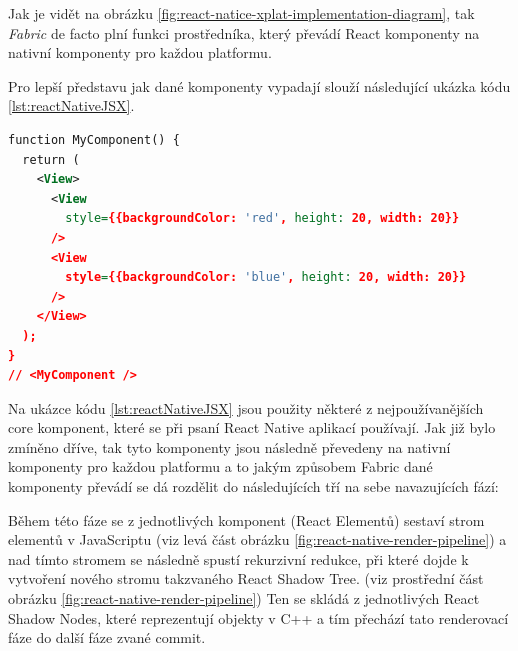 



Jak je vidět na obrázku \ref{fig:react-natice-xplat-implementation-diagram}, tak \textit{Fabric} de facto plní funkci prostředníka, který převádí React 
komponenty na nativní komponenty pro každou platformu. 

Pro lepší představu jak dané komponenty vypadají slouží následující ukázka kódu \ref{lst:reactNativeJSX}.

\begin{lstlisting}[caption={Popis UI komponent pomoci JSX}, label={lst:reactNativeJSX}, language=XML]
function MyComponent() {
  return (
    <View>
      <View
        style={{backgroundColor: 'red', height: 20, width: 20}}
      />
      <View
        style={{backgroundColor: 'blue', height: 20, width: 20}}
      />
    </View>
  );
}
// <MyComponent />
\end{lstlisting}

Na ukázce kódu \ref{lst:reactNativeJSX} jsou použity některé z nejpoužívanějších core komponent, které se při psaní React
Native aplikací používají. \cite{reactNativeComponents} Jak již bylo zmíněno dříve, tak tyto komponenty jsou následně převedeny 
na nativní komponenty pro každou platformu a to jakým způsobem Fabric dané komponenty převádí se dá rozdělit do následujících tří
na sebe navazujících fází: \cite{reactNativeRenderCommitMount}
 

\smallskip

Během této fáze se z jednotlivých komponent (React Elementů) sestaví strom elementů v JavaScriptu (viz levá část obrázku \ref{fig:react-native-render-pipeline}) a nad tímto stromem se 
následně spustí rekurzivní redukce, při které dojde k vytvoření nového stromu takzvaného React Shadow Tree. (viz prostřední část obrázku \ref{fig:react-native-render-pipeline})
\cite{reactNativeRenderCommitMount} Ten se skládá z jednotlivých React Shadow Nodes, které reprezentují objekty v C++ a tím přechází tato renderovací fáze do další fáze zvané commit.\cite{reactNativeRenderCommitMount}

